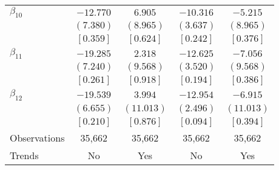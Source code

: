 \documentclass[12pt]{article}
\begin{document}
\begin{table}[H]
\begin{adjustbox}{scale=0.7}
\begin{tabular}{lcccc}
$\beta_{10}$ & $-12.770$ & $  6.905$ & $-10.316$ & $ -5.215$ \\
& $(  7.380)$ & $(  8.965)$ & $(  3.637)$ & $(  8.965)$ \\
& $[  0.359]$ & $[  0.624]$ & $[  0.242]$ & $[  0.376]$ \\
$\beta_{11}$ & $-19.285$ & $  2.318$ & $-12.625$ & $ -7.056$ \\
& $(  7.240)$ & $(  9.568)$ & $(  3.520)$ & $(  9.568)$ \\
& $[  0.261]$ & $[  0.918]$ & $[  0.194]$ & $[  0.386]$ \\
$\beta_{12}$ & $-19.539$ & $  3.994$ & $-12.954$ & $ -6.915$ \\
& $(  6.655)$ & $( 11.013)$ & $(  2.496)$ & $( 11.013)$ \\
& $[  0.210]$ & $[  0.876]$ & $[  0.094]$ & $[  0.394]$ \\
\midrule
Observations & 35,662 & 35,662 & 35,662 & 35,662 \\
Trends & No & Yes & No & Yes \\
\bottomrule
\end{tabular}
\end{adjustbox}
\begin{threeparttable}
\end{threeparttable}
\end{table}
\end{document}
